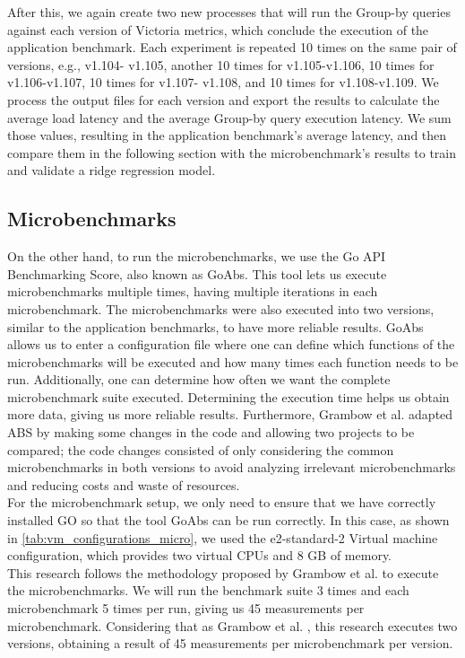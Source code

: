 After this, we again create two new processes that will run the Group-by queries against each version of Victoria metrics, which conclude the execution of the application benchmark. Each experiment is repeated 10 times on the same pair of versions, e.g., v1.104- v1.105, another 10 times for v1.105-v1.106, 10 times for v1.106-v1.107, 10 times for v1.107- v1.108, and 10 times for v1.108-v1.109. We process the output files for each version and export the results to calculate the average load latency and the average Group-by query execution latency. We sum those values, resulting in the application benchmark’s average latency, and then compare them in the following section with the microbenchmark’s results to train and validate a ridge regression model. 

\subsection{Microbenchmarks}
On the other hand, to run the microbenchmarks, we use the Go API Benchmarking Score, also known as \ac{GoAbs}. This tool lets us execute microbenchmarks multiple times, having multiple iterations in each microbenchmark. The microbenchmarks were also executed into two versions, similar to the application benchmarks, to have more reliable results. \ac{GoAbs} allows us to enter a configuration file where one can define which functions of the microbenchmarks will be executed and how many times each function needs to be run. Additionally, one can determine how often we want the complete microbenchmark suite executed. Determining the execution time helps us obtain more data, giving us more reliable results. Furthermore, Grambow et al. \cite{grambow} adapted ABS by making some changes in the code and allowing two projects to be compared; the code changes consisted of only considering the common microbenchmarks in both versions to avoid analyzing irrelevant microbenchmarks and reducing costs and waste of resources. \\
For the microbenchmark setup, we only need to ensure that we have correctly installed GO so that the tool \ac{GoAbs} can be run correctly. In this case, as shown in \cref{tab:vm_configurations_micro}, we used the e2-standard-2 Virtual machine configuration, which provides two virtual \ac{CPU}s and 8 GB of memory. \\
This research follows the methodology proposed by Grambow et al. \cite{grambow} to execute the microbenchmarks. We will run the benchmark suite 3 times and each microbenchmark 5 times per run, giving us 45 measurements per microbenchmark. Considering that as Grambow et al. \cite{grambow}, this research executes two versions, obtaining a result of 45 measurements per microbenchmark per version. \\

